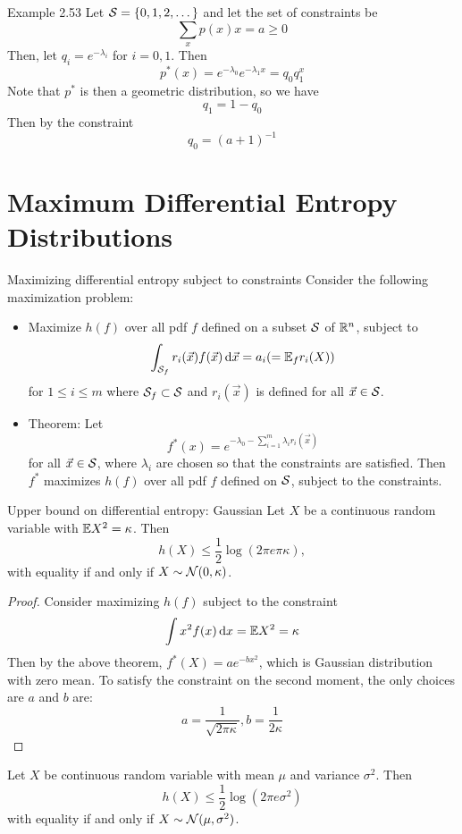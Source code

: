 \documentclass[../main.tex]{subfiles}
\begin{document}
\begin{pbox}{Example 2.53}
    Let $\S= \{0,1,2,\dots\}$ and let the set of constraints be \[
    \sum_x p(x)x=a \geq 0
    \] 
    Then, let $q_i=e^{-\lambda_i}$ for $i=0,1$. Then
    \[
    p^*(x) = e^{-\lambda_0}e^{-\lambda_1 x} = q_0 q_1^x
    \]
    Note that $p^*$ is then a geometric distribution, so we have \[
    q_1 = 1-q_0
    \]
    Then by the constraint \[
    q_0 = (a+1)^{-1}
    \]
\end{pbox}
\section{Maximum Differential Entropy Distributions}
\begin{bbox}{Maximizing differential entropy subject to constraints}
    Consider the following maximization problem:
    \begin{itemize}
        \item Maximize $h(f)$ over all pdf $f$ defined on a subset $\S$ of $\bR^n$, subject to \[
        \int_{\S_f}r_i(\vec x)f(\vec x)\dd \vec x = a_i (=\bE_f r_i(X))
        \] for $1\leq i \leq m$
     where $\S_f \subset \S$ and $r_i(\vec x)$ is defined for all $\vec x\in \S$.
     
     \item Theorem: Let \[
     f^*(x)=e^{-\lambda_0 -\sum_{i=1}^m \lambda_i r_i(\vec x)}
     \] for all $\vec x\in\S$, where $\lambda_i$ are chosen so that the constraints are satisfied. Then $f^*$ maximizes $h(f)$ over all pdf $f$ defined on $\S$, subject to the constraints.
     \end{itemize}
\end{bbox}
\begin{bbox}{Upper bound on differential entropy: Gaussian}
    Let $X$ be a continuous random variable with $\bE X^2 =\kappa$. Then \[
    h(X) \leq \frac{1}{2}\log(2\pi e\pi\kappa),
    \] with equality if and only if $X\sim \N(0,\kappa)$.
    \begin{proof}
        Consider maximizing $h(f)$ subject to the constraint \[
        \int x^2 f(x)\dd x = \bE X^2 = \kappa
        \]
        Then by the above theorem, $f^*(X)=a e^{-bx^2}$, which is Gaussian distribution with zero mean.
        \newline
        To satisfy the constraint on the second moment, the only choices are $a$ and $b$ are:\[
        a=\frac{1}{\sqrt{2\pi\kappa}}, b=\frac{1}{2\kappa}
        \]
    \end{proof}
    \begin{remark}
         Let $X$ be continuous random variable with mean $\mu$ and variance $\sigma^2$. Then \[
         h(X) \leq \frac{1}{2}\log(2\pi e \sigma^2)
         \] with equality if and only if $X\sim \N(\mu, \sigma^2)$.
    \end{remark}
\end{bbox}
\end{document}
